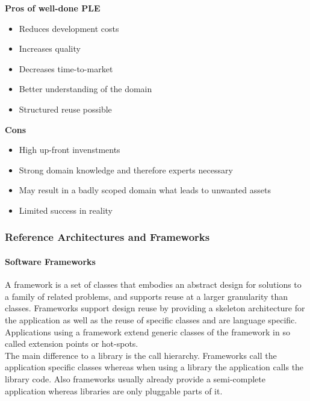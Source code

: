 \begin{minipage}[t]{0.49\textwidth}
    \textbf{Pros of well-done PLE}
    \begin{itemize}[topsep=0pt, itemsep=0pt]
        \item Reduces development costs
        \item Increases quality
        \item Decreases time-to-market
        \item Better understanding of the domain
        \item Structured reuse possible
    \end{itemize}
\end{minipage}
\begin{minipage}[t]{0.49\textwidth}
    \textbf{Cons}
    \begin{itemize}[topsep=0pt, itemsep=0pt]
        \item High up-front invenstments
        \item Strong domain knowledge and therefore experts necessary
        \item May result in a badly scoped domain what leads to unwanted assets
        \item Limited success in reality
    \end{itemize}
\end{minipage}

\subsubsection{Reference Architectures and Frameworks}
\paragraph{Software Frameworks}
A framework is a set of classes that embodies an abstract design for solutions to a family of related problems, and supports reuse at a larger granularity than classes.
Frameworks support design reuse by providing a skeleton architecture for the application as well as the reuse of specific classes and are language specific.
Applications using a framework extend generic classes of the framework in so called extension points or hot-spots.\\
The main difference to a library is the call hierarchy.
Frameworks call the application specific classes whereas when using a library the application calls the library code.
Also frameworks usually already provide a semi-complete application whereas libraries are only pluggable parts of it.

